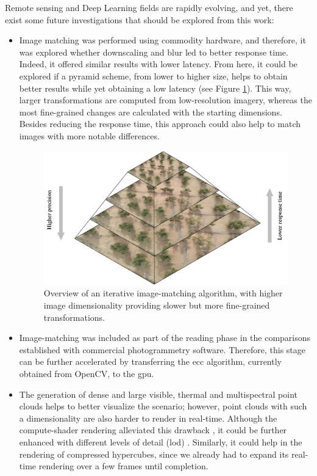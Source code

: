 Remote sensing and Deep Learning fields are rapidly evolving, and yet, there exist some future investigations that should be explored from this work:
\begin{itemize}
    \item Image matching was performed using commodity hardware, and therefore, it was explored whether downscaling and blur led to better response time. Indeed, it offered similar results with lower latency. From here, it could be explored if a pyramid scheme, from lower to higher size, helps to obtain better results while yet obtaining a low latency (see Figure \ref{fig:image_pyramid}). This way, larger transformations are computed from low-resolution imagery, whereas the most fine-grained changes are calculated with the starting dimensions. Besides reducing the response time, this approach could also help to match images with more notable differences.
    \begin{figure}
        \centering
        \includegraphics[width=\linewidth]{figs/conclusions/image_pyramid.png}
        \caption{Overview of an iterative image-matching algorithm, with higher image dimensionality providing slower but more fine-grained transformations.}
        \label{fig:image_pyramid}
    \end{figure}
    \item Image-matching was included as part of the reading phase in the comparisons established with commercial photogrammetry software. Therefore, this stage can be further accelerated by transferring the \acrshort{ecc} algorithm, currently obtained from OpenCV, to the \acrshort{gpu}.
    \item The generation of dense and large visible, thermal and multispectral point clouds helps to better visualize the scenario; however, point clouds with such a dimensionality are also harder to render in real-time. Although the compute-shader rendering alleviated this drawback \cite{schutz_rendering_2021}, it could be further enhanced with different levels of detail (\acrshort{lod}) \cite{schutz_gpu-accelerated_2023}. Similarly, it could help in the rendering of compressed hypercubes, since we already had to expand its real-time rendering over a few frames until completion.

\end{itemize}
